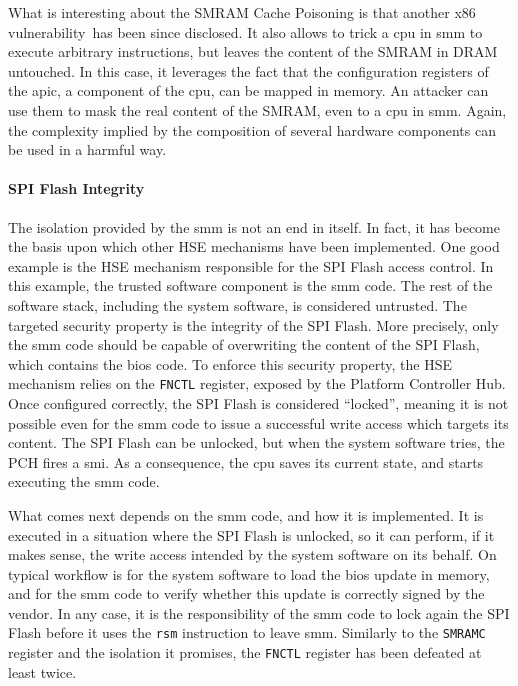 What is interesting about the SMRAM Cache Poisoning is that another x86
vulnerability\,\cite{domas2015sinkhole} has been since disclosed.
%
It also allows to trick a \ac{cpu} in \ac{smm} to execute arbitrary
instructions, but leaves the content of the SMRAM in DRAM untouched.
%
In this case, it leverages the fact that the configuration registers of the
\ac{apic}, a component of the \ac{cpu}, can be mapped in memory.
%
An attacker can use them to mask the real content of the SMRAM, even to a
\ac{cpu} in \ac{smm}.
%
Again, the complexity implied by the composition of several hardware components
can be used in a harmful way.


\paragraph{SPI Flash Integrity}
%
The isolation provided by the \ac{smm} is not an end in itself.
%
In fact, it has become the basis upon which other HSE mechanisms have been
implemented.
%
One good example is the HSE mechanism responsible for the SPI Flash access
control.
%
In this example, the trusted software component is the \ac{smm} code.
%
The rest of the software stack, including the system software, is considered
untrusted.
%
The targeted security property is the integrity of the SPI Flash.
%
More precisely, only the \ac{smm} code should be capable of overwriting the content
of the SPI Flash, which contains the \ac{bios} code.
%
To enforce this security property, the HSE mechanism relies on the
\texttt{FNCTL}  register,
exposed by the Platform Controller Hub.
%
Once configured correctly, the SPI Flash is considered ``locked'', meaning it is
not possible even for the \ac{smm} code to issue a successful write access which
targets its content.
%
The SPI Flash can be unlocked, but when the system software tries, the PCH fires
a \ac{smi}.
%
As a consequence, the \ac{cpu} saves its current state, and starts executing the \ac{smm}
code.

What comes next depends on the \ac{smm} code, and how it is implemented.
%
It is executed in a situation where the SPI Flash is unlocked, so it can
perform, if it makes sense, the write access intended by the system software on
its behalf.
%
On typical workflow is for the system software to load the \ac{bios} update in
memory, and for the \ac{smm} code to verify whether this update is correctly signed
by the vendor.
%
In any case, it is the responsibility of the \ac{smm} code to lock again the SPI
Flash before it uses the \texttt{rsm} instruction to leave \ac{smm}.
%
Similarly to the \texttt{SMRAMC} register and the isolation it promises, the
\texttt{FNCTL} register has been defeated at least twice.

